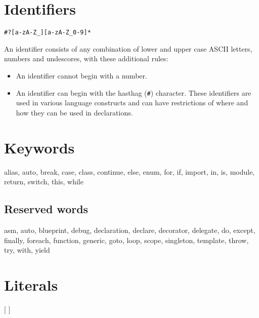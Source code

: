 \section{Identifiers}
\begin{grammar}
	 \verb|#?[a-zA-Z_][a-zA-Z_0-9]*|
\end{grammar}
An identifier consists of any combination of lower and upper case ASCII letters, numbers and undescores, with these additional rules:
\begin{itemize}
	\item An identifier cannot begin with a number.
	\item An identifier can begin with the hasthag (\verb|#|) character. These identifiers are used in various language constructs and can have restrictions of where and how they can be used in declarations.
\end{itemize}

\section{Keywords} \label{keywords}
\begin{code}
alias, auto, break, case, class, continue, else, enum, for, if, import, in, is, module, return, switch, this, while
\end{code}

\subsection{Reserved words}
\begin{code}
asm, auto, blueprint, debug, declaration, declare, decorator, delegate, do, except, finally, foreach, function, generic, goto, loop, scope, singleton, template, throw, try, with, yield
\end{code}

\section{Literals}
\begin{grammar}
	  [  ] \\
	  \\
		\grAltLn {} \\
		\grAltLn {} \\
		\grAltLn {} \\
		\grAltLn {} \\
		\grAltLn {} \\
\end{grammar}

